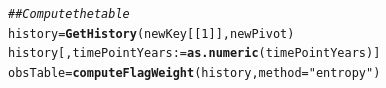 \documentclass[nojss]{jss}\usepackage[]{graphicx}\usepackage[]{color}
\makeatletter
\newcommand{\hlnum}[1]{\textcolor[rgb]{0.686,0.059,0.569}{#1}}%
\newcommand{\hlstr}[1]{\textcolor[rgb]{0.192,0.494,0.8}{#1}}%
\newcommand{\hlcom}[1]{\textcolor[rgb]{0.678,0.584,0.686}{\textit{#1}}}%
\newcommand{\hlstd}[1]{\textcolor[rgb]{0.345,0.345,0.345}{#1}}%
\newcommand{\hlkwb}[1]{\textcolor[rgb]{0.69,0.353,0.396}{#1}}%
\newcommand{\hlkwc}[1]{\textcolor[rgb]{0.333,0.667,0.333}{#1}}%
\newcommand{\hlkwd}[1]{\textcolor[rgb]{0.737,0.353,0.396}{\textbf{#1}}}%
\newenvironment{kframe}{%
 \def\at@end@of@kframe{}%
 \ifinner\ifhmode%
  \def\at@end@of@kframe{\end{minipage}}%
  \begin{minipage}{\columnwidth}%
 \fi\fi%
 \def\FrameCommand##1{\hskip\@totalleftmargin \hskip-\fboxsep
 \colorbox{shadecolor}{##1}\hskip-\fboxsep
     \hskip-\linewidth \hskip-\@totalleftmargin \hskip\columnwidth}%
 \MakeFramed {\advance\hsize-\width
   \@totalleftmargin\z@ \linewidth\hsize
   \@setminipage}}%
 {\par\unskip\endMakeFramed%
 \at@end@of@kframe}
\newenvironment{knitrout}{}{} %
\makeatother
\begin{document}
\begin{knitrout}
\begin{kframe}
\begin{alltt}
\hlcom{## Compute the table}
\hlstd{history} \hlkwb{=} \hlkwd{GetHistory}\hlstd{(newKey[[}\hlnum{1}\hlstd{]], newPivot)}
\hlstd{history[, timePointYears} \hlkwb{:=} \hlkwd{as.numeric}\hlstd{(timePointYears)]}
\hlstd{obsTable} \hlkwb{=} \hlkwd{computeFlagWeight}\hlstd{(history,} \hlkwc{method} \hlstd{=} \hlstr{"entropy"}\hlstd{)}
\end{alltt}
\end{kframe}
\end{knitrout}




\end{document}
